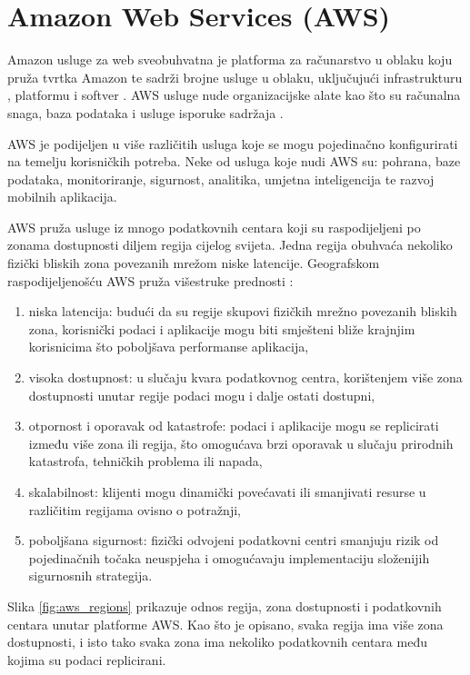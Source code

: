 \chapter{Amazon Web Services (AWS)}

Amazon usluge za web  sveobuhvatna je platforma za računarstvo u oblaku koju pruža tvrtka Amazon te sadrži brojne usluge u oblaku, uključujući infrastrukturu , platformu  i softver . AWS usluge nude organizacijske alate kao što su računalna snaga, baza podataka i usluge isporuke sadržaja \cite{what_is_aws}. 

AWS je podijeljen u više različitih usluga koje se mogu pojedinačno konfigurirati na temelju korisničkih potreba. Neke od usluga koje nudi AWS su: pohrana, baze podataka, monitoriranje, sigurnost, analitika, umjetna inteligencija te razvoj mobilnih aplikacija. 

AWS pruža usluge iz mnogo podatkovnih centara  koji su raspodijeljeni po zonama dostupnosti  diljem regija cijelog svijeta. Jedna regija obuhvaća nekoliko fizički bliskih zona povezanih mrežom niske latencije. Geografskom raspodijeljenošću AWS pruža višestruke prednosti \cite{aws_regions}:
\begin{enumerate}
	\item niska latencija: budući da su regije skupovi fizičkih mrežno povezanih bliskih zona, korisnički podaci i aplikacije mogu biti smješteni bliže krajnjim korisnicima što poboljšava performanse aplikacija,
	\item visoka dostupnost: u slučaju kvara podatkovnog centra, korištenjem više zona dostupnosti unutar regije podaci mogu i dalje ostati dostupni,
	\item otpornost i oporavak od katastrofe: podaci i aplikacije mogu se replicirati između više zona ili regija, što omogućava brzi oporavak u slučaju prirodnih katastrofa, tehničkih problema ili napada,
	\item skalabilnost: klijenti mogu dinamički povećavati ili smanjivati resurse u različitim regijama ovisno o potražnji,
	\item poboljšana sigurnost: fizički odvojeni podatkovni centri smanjuju rizik od pojedinačnih točaka neuspjeha i omogućavaju implementaciju složenijih sigurnosnih strategija.
\end{enumerate}

Slika \ref{fig:aws_regions} prikazuje odnos regija, zona dostupnosti i podatkovnih centara unutar platforme AWS. Kao što je opisano, svaka regija ima više zona dostupnosti, i isto tako svaka zona ima nekoliko podatkovnih centara među kojima su podaci replicirani. 

